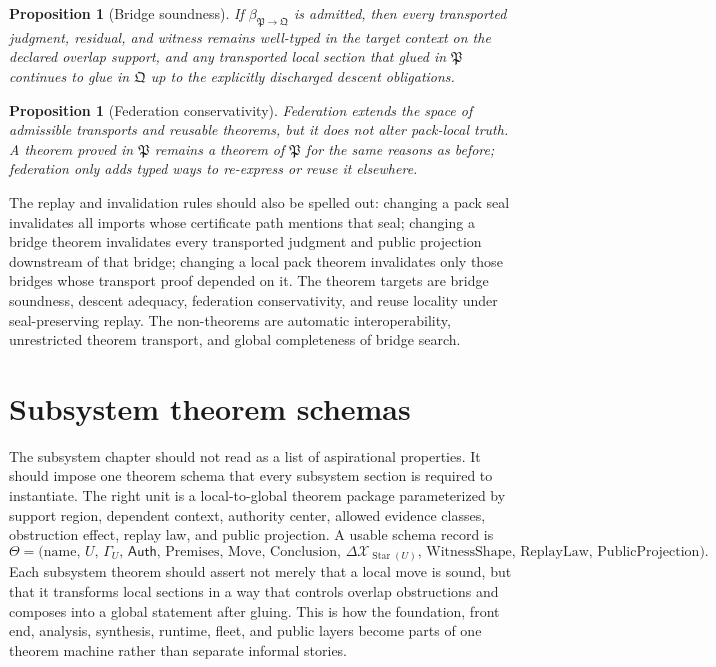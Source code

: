 \documentclass[11pt]{report}
\newtheorem{proposition}[definition]{Proposition}
\begin{document}
\begin{proposition}[Bridge soundness]
If $\beta_{\mathfrak{P}\to\mathfrak{Q}}$ is admitted, then every transported judgment, residual, and witness remains well-typed in the target context on the declared overlap support, and any transported local section that glued in $\mathfrak{P}$ continues to glue in $\mathfrak{Q}$ up to the explicitly discharged descent obligations.
\end{proposition}

\begin{proposition}[Federation conservativity]
Federation extends the space of admissible transports and reusable theorems, but it does not alter pack-local truth. A theorem proved in $\mathfrak{P}$ remains a theorem of $\mathfrak{P}$ for the same reasons as before; federation only adds typed ways to re-express or reuse it elsewhere.
\end{proposition}

The replay and invalidation rules should also be spelled out: changing a pack seal invalidates all imports whose certificate path mentions that seal; changing a bridge theorem invalidates every transported judgment and public projection downstream of that bridge; changing a local pack theorem invalidates only those bridges whose transport proof depended on it. The theorem targets are bridge soundness, descent adequacy, federation conservativity, and reuse locality under seal-preserving replay. The non-theorems are automatic interoperability, unrestricted theorem transport, and global completeness of bridge search.

\chapter{Subsystem theorem schemas}
The subsystem chapter should not read as a list of aspirational properties. It should impose one theorem schema that every subsystem section is required to instantiate. The right unit is a local-to-global theorem package parameterized by support region, dependent context, authority center, allowed evidence classes, obstruction effect, replay law, and public projection. A usable schema record is
\[
\Theta
=
\bigl(
\mathrm{name},\,
U,\,
\Gamma_U,\,
\mathsf{Auth},\,
\mathrm{Premises},\,
\mathrm{Move},\,
\mathrm{Conclusion},\,
\Delta\mathcal{X}_{\operatorname{Star}(U)},\,
\mathrm{WitnessShape},\,
\mathrm{ReplayLaw},\,
\mathrm{PublicProjection}
\bigr).
\]
Each subsystem theorem should assert not merely that a local move is sound, but that it transforms local sections in a way that controls overlap obstructions and composes into a global statement after gluing. This is how the foundation, front end, analysis, synthesis, runtime, fleet, and public layers become parts of one theorem machine rather than separate informal stories.
\end{document}
